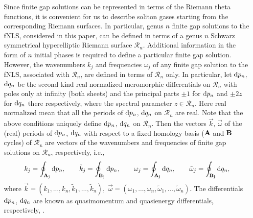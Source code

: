 \documentclass[10pt,a4paper]{amsart}
\numberwithin{equation}{section}
\renewcommand{\o}{\omega}
\def\Rscr{\mathcal{R}}
\def\o{\omega}
\def\tk{\tilde k}
\def\to{\tilde \o}
\begin{document}
Since finite gap solutions can be represented in terms of the Riemann theta functions, it is convenient for us to describe soliton gases starting from the corresponding Riemann surfaces. In particular, genus $n$
finite gap solutions to the fNLS, considered in this paper, can be defined in terms of a genus $n$ Schwarz symmetrical hyperelliptic Riemann surface $\Rscr_n$. Additional information in the form of $n$ initial phases is required to define a particular finite gap solution. However, the
wavenumbers $k_j$ and frequencies $\o_j$ of any finite gap solution to the fNLS, associated with $\Rscr_n$, are defined in terms of $\Rscr_n$ only. In particular, let ${\rm d}p_n$, ${\rm d}q_n$ be the second kind real normalized meromorphic differentials on $\Rscr_n$ with poles only at infinity (both sheets) and the principal parts $\pm 1$ for ${\rm d}p_n$ and $\pm 2z$ for ${\rm d}q_n$ there respectively, where the spectral parameter $z\in \Rscr_n$. Here real normalized mean that all the periods of ${\rm d}p_n$, ${\rm d}q_n$ on $\Rscr_n$ are real.
Note that the above conditions uniquely define ${\rm d}p_n$, ${\rm d}q_n$ on $\Rscr_n$.
Then the vectors $\vec k$, $\vec \o$ of the (real) periods of ${\rm d}p_n$, ${\rm d}q_n$ with respect to a fixed homology basis ($\bf A$ and $\bf B$ cycles) of $\Rscr_n$ are vectors of the wavenumbers and frequencies of finite gap solutions on $\Rscr_n$, respectively, i.e.,
\begin{equation*}%
k_j=\oint_{\bf A_j}{\rm d}p_n,\qquad \tk_j= \oint_{\bf B_j}{\rm d}p_n,\qquad
\o_j=\oint_{\bf A_j}{\rm d}q_n,\qquad \to _j= \oint_{\bf B_j}{\rm d}q_n,
\end{equation*}
%
where $\vec k=(k_1,\dots,k_n,\tk_1,\dots,\tk_n),$ $\vec \o=(\o_1,\dots,\o_n,\to_1,\dots,\to_n)$.
The differentials ${\rm d}p_n$, ${\rm d}q_n$ are known as quasimomentum and quasienergy differentials, respectively, \cite{FFM,ForLee}.
\end{document}

